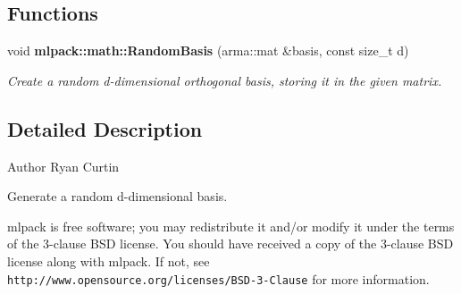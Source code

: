 \subsection*{Functions}
\begin{DoxyCompactItemize}
\item 
void {\bf mlpack\+::math\+::\+Random\+Basis} (arma\+::mat \&basis, const size\+\_\+t d)
\begin{DoxyCompactList}\small\item\em Create a random d-\/dimensional orthogonal basis, storing it in the given matrix. \end{DoxyCompactList}\end{DoxyCompactItemize}


\subsection{Detailed Description}
\begin{DoxyAuthor}{Author}
Ryan Curtin
\end{DoxyAuthor}
Generate a random d-\/dimensional basis.

mlpack is free software; you may redistribute it and/or modify it under the terms of the 3-\/clause B\+SD license. You should have received a copy of the 3-\/clause B\+SD license along with mlpack. If not, see {\tt http\+://www.\+opensource.\+org/licenses/\+B\+S\+D-\/3-\/\+Clause} for more information. 